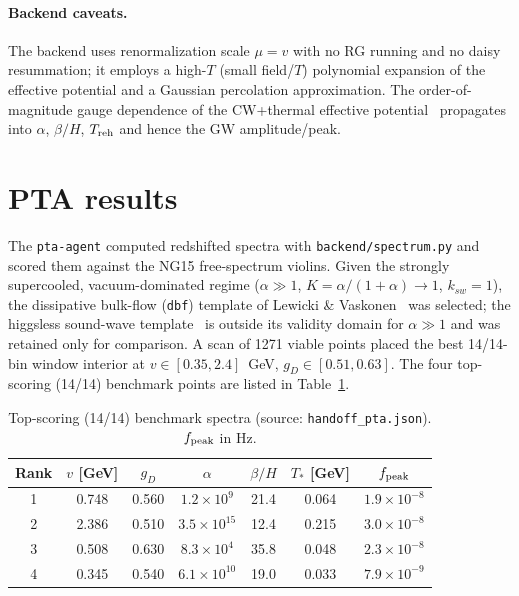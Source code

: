 \documentclass[11pt]{article}
\newcommand{\gD}{g_D}
\newcommand{\betaH}{\beta/H}
\begin{document}
\paragraph{Backend caveats.} The backend uses renormalization scale $\mu=v$
with no RG running and no daisy resummation; it employs a high-$T$ (small
field/$T$) polynomial expansion of the effective potential and a Gaussian
percolation approximation. The order-of-magnitude gauge dependence of the
CW+thermal effective potential~\cite{Chiang2017} propagates into $\alpha$,
$\betaH$, $T_{\rm reh}$ and hence the GW amplitude/peak.

\section{PTA results}
\label{sec:pta}
The \texttt{pta-agent} computed redshifted spectra with
\texttt{backend/spectrum.py} and scored them against the NG15 free-spectrum
violins. Given the strongly supercooled, vacuum-dominated regime
($\alpha\gg1$, $K=\alpha/(1+\alpha)\to1$, $k_{sw}=1$), the dissipative
bulk-flow (\texttt{dbf}) template of Lewicki \&
Vaskonen~\cite{Lewicki2025} was selected; the higgsless sound-wave
template~\cite{Jinno2022} is outside its validity domain for $\alpha\gg1$ and
was retained only for comparison. A scan of 1271 viable points placed the
best 14/14-bin window interior at $v\in[0.35,2.4]$~GeV, $\gD\in[0.51,0.63]$.
The four top-scoring (14/14) benchmark points are listed in
Table~\ref{tab:pta}.

\begin{table}[ht]
\centering\small
\caption{Top-scoring (14/14) benchmark spectra (source:
\texttt{handoff\_pta.json}). $f_{\rm peak}$ in Hz.}
\label{tab:pta}
\begin{tabular}{c c c c c c c}
\toprule
Rank & $v$ [GeV] & $\gD$ & $\alpha$ & $\betaH$ & $T_*$ [GeV] & $f_{\rm peak}$ \\
\midrule
1 & 0.748 & 0.560 & $1.2\times10^{9}$ & 21.4 & 0.064 & $1.9\times10^{-8}$ \\
2 & 2.386 & 0.510 & $3.5\times10^{15}$ & 12.4 & 0.215 & $3.0\times10^{-8}$ \\
3 & 0.508 & 0.630 & $8.3\times10^{4}$ & 35.8 & 0.048 & $2.3\times10^{-8}$ \\
4 & 0.345 & 0.540 & $6.1\times10^{10}$ & 19.0 & 0.033 & $7.9\times10^{-9}$ \\
\bottomrule
\end{tabular}
\end{table}
\end{document}
